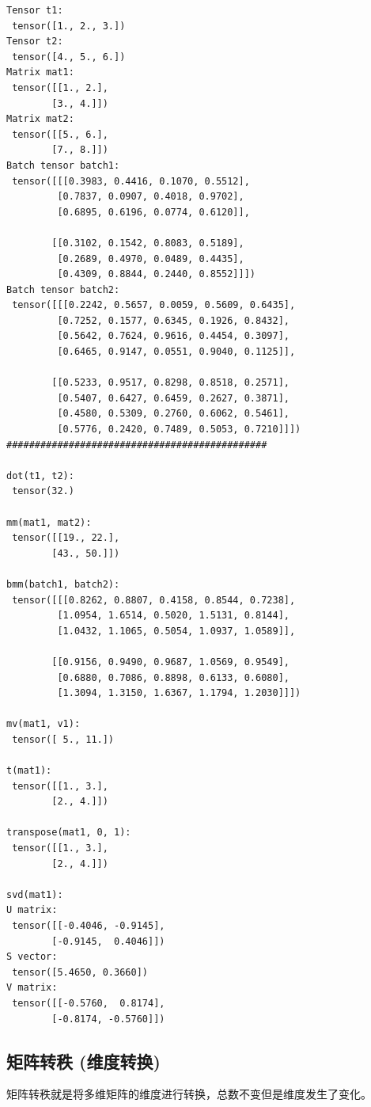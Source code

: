 \begin{lstlisting}[style=demostyle,numbers=none]
Tensor t1:
 tensor([1., 2., 3.])
Tensor t2:
 tensor([4., 5., 6.])
Matrix mat1:
 tensor([[1., 2.],
        [3., 4.]])
Matrix mat2:
 tensor([[5., 6.],
        [7., 8.]])
Batch tensor batch1:
 tensor([[[0.3983, 0.4416, 0.1070, 0.5512],
         [0.7837, 0.0907, 0.4018, 0.9702],
         [0.6895, 0.6196, 0.0774, 0.6120]],

        [[0.3102, 0.1542, 0.8083, 0.5189],
         [0.2689, 0.4970, 0.0489, 0.4435],
         [0.4309, 0.8844, 0.2440, 0.8552]]])
Batch tensor batch2:
 tensor([[[0.2242, 0.5657, 0.0059, 0.5609, 0.6435],
         [0.7252, 0.1577, 0.6345, 0.1926, 0.8432],
         [0.5642, 0.7624, 0.9616, 0.4454, 0.3097],
         [0.6465, 0.9147, 0.0551, 0.9040, 0.1125]],

        [[0.5233, 0.9517, 0.8298, 0.8518, 0.2571],
         [0.5407, 0.6427, 0.6459, 0.2627, 0.3871],
         [0.4580, 0.5309, 0.2760, 0.6062, 0.5461],
         [0.5776, 0.2420, 0.7489, 0.5053, 0.7210]]])
##############################################

dot(t1, t2):
 tensor(32.)

mm(mat1, mat2):
 tensor([[19., 22.],
        [43., 50.]])

bmm(batch1, batch2):
 tensor([[[0.8262, 0.8807, 0.4158, 0.8544, 0.7238],
         [1.0954, 1.6514, 0.5020, 1.5131, 0.8144],
         [1.0432, 1.1065, 0.5054, 1.0937, 1.0589]],

        [[0.9156, 0.9490, 0.9687, 1.0569, 0.9549],
         [0.6880, 0.7086, 0.8898, 0.6133, 0.6080],
         [1.3094, 1.3150, 1.6367, 1.1794, 1.2030]]])

mv(mat1, v1):
 tensor([ 5., 11.])

t(mat1):
 tensor([[1., 3.],
        [2., 4.]])

transpose(mat1, 0, 1):
 tensor([[1., 3.],
        [2., 4.]])

svd(mat1):
U matrix:
 tensor([[-0.4046, -0.9145],
        [-0.9145,  0.4046]])
S vector:
 tensor([5.4650, 0.3660])
V matrix:
 tensor([[-0.5760,  0.8174],
        [-0.8174, -0.5760]])
\end{lstlisting}



\subsection{矩阵转秩 (维度转换)}
\label{subsubsec:Pytorch矩阵转秩}
矩阵转秩就是将多维矩阵的维度进行转换，总数不变但是维度发生了变化。

